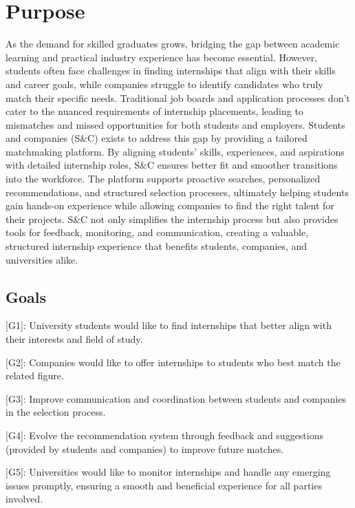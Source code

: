 \section{Purpose}
\label{sec:purpose}%

As the demand for skilled graduates grows, bridging the gap between academic learning and practical industry experience has become essential. However, students often face challenges in finding internships that align with their skills and career goals, while companies struggle to identify candidates who truly match their specific needs. Traditional job boards and application processes don’t cater to the nuanced requirements of internship placements, leading to mismatches and missed opportunities for both students and employers.
Students and companies (S\&C) exists to address this gap by providing a tailored matchmaking platform. By aligning students’ skills, experiences, and aspirations with detailed internship roles, S\&C ensures better fit and smoother transitions into the workforce. The platform supports proactive searches, personalized recommendations, and structured selection processes, ultimately helping students gain hands-on experience while allowing companies to find the right talent for their projects. S\&C not only simplifies the internship process but also provides tools for feedback, monitoring, and communication, creating a valuable, structured internship experience that benefits students, companies, and universities alike.


\subsection{Goals}
\label{subsec:goals}%

{[}G1{]}: University students would like to find internships that better
align with their interests and field of study.

{[}G2{]}: Companies would like to offer internships to students who best
match the related figure.

{[}G3{]}: Improve communication and coordination between students and
companies in the selection process.

{[}G4{]}: Evolve the recommendation system through feedback and
suggestions (provided by students and companies) to improve future
matches.

{[}G5{]}: Universities would like to monitor internships and handle any
emerging issues promptly, ensuring a smooth and beneficial experience
for all parties involved.

